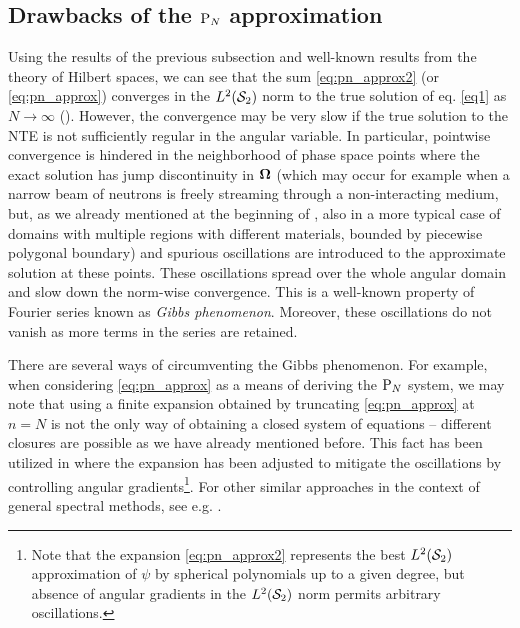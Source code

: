 \subsection{Drawbacks of the $\PN$ approximation} \label{sec:drawbacksPN}
Using the results of the previous subsection and well-known results from the theory of Hilbert spaces, we can see that
the sum \eqref{eq:pn_approx2} (or \eqref{eq:pn_approx}) converges in the $\Lp[2](\Sphere)$ norm to the true solution of
eq. \eqref{eq1} as $N\to\infty$ (\cite[Thm. 3.54]{Schreiner}). However, the convergence may be very slow if the true
solution to the NTE is not sufficiently regular in the angular variable. In particular, pointwise convergence is hindered in the neighborhood of
phase space points where the exact solution has jump discontinuity in $\bomega$ (which may occur for example
when a narrow beam of neutrons is freely streaming through a non-interacting medium, but, as we already mentioned at the
beginning of , also in a more typical case of domains with multiple regions with different materials,
bounded by piecewise polygonal boundary) and spurious oscillations are introduced to the approximate solution at these points.
These oscillations spread over the whole angular domain and slow down the norm-wise convergence. This is a well-known
property of Fourier series known as \textit{Gibbs
phenomenon}.
Moreover, these oscillations do not vanish as more terms in the series are retained. 

There are several ways of
circumventing the Gibbs phenomenon. For example, when considering \eqref{eq:pn_approx} as a means of deriving the $\PN$
system, we may note that using a finite expansion obtained by truncating \eqref{eq:pn_approx} at $n=N$ is not the only
way of obtaining a closed system of equations -- different closures are possible as we have already mentioned before.
This fact has been utilized in \cite{McClarren3} where the expansion has been adjusted to mitigate the oscillations by controlling
angular gradients\footnote{Note that the expansion \eqref{eq:pn_approx2} represents the best $\Lp[2](\Sphere)$
approximation of $\psi$ by spherical polynomials up to a given degree, but absence of angular gradients in the
$\Lp[2](\Sphere)$ norm permits arbitrary oscillations.}. For other similar approaches in the context of general spectral
methods, see e.g. \cite{Tanner}.

